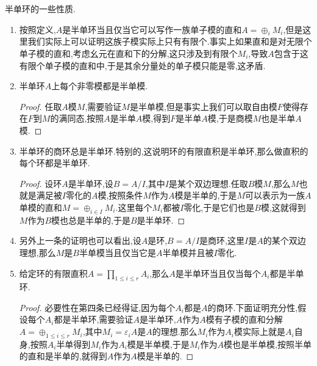 半单环的一些性质.
\begin{enumerate}
	\item 按照定义,$A$是半单环当且仅当它可以写作一族单子模的直和$A=\oplus_iM_i$,但是这里我们实际上可以证明这族子模实际上只有有限个.事实上如果直和是对无限个单子模的直和,考虑幺元在直和下的分解,这只涉及到有限个$M_i$,导致$A$包含于这有限个单子模的直和中,于是其余分量处的单子模只能是零,这矛盾.
	\item 半单环$A$上每个非零模都是半单模.
	\begin{proof}
		
		任取$A$模$M$,需要验证$M$是半单模,但是事实上我们可以取自由模$F$使得存在$F$到$M$的满同态,按照$A$是半单$A$模,得到$F$是半单$A$模,于是商模$M$也是半单$A$模.
	\end{proof}
	\item 半单环的商环总是半单环.特别的,这说明环的有限直积是半单环,那么做直积的每个环都是半单环.
	\begin{proof}
		
		设环$A$是半单环,设$B=A/I$,其中$I$是某个双边理想.任取$B$模$M$,那么$M$也就是满足被$I$零化的$A$模,按照条件$M$作为$A$模是半单的,于是$M$可以表示为一族$A$单模的直和$M=\oplus_{i\in I}M_i$.这里每个$M_i$都被$I$零化,于是它们也是$B$模,这就得到$M$作为$B$模也总是半单的,于是$B$是半单环.
	\end{proof}
	\item 另外上一条的证明也可以看出,设$A$是环,$B=A/I$是商环,这里$I$是$A$的某个双边理想,那么$M$是$B$半单模当且仅当它是$A$半单模并且被$I$零化.
	\item 给定环的有限直积$A=\prod_{1\le i\le r}A_i$,那么$A$是半单环当且仅当每个$A_i$都是半单环.
	\begin{proof}
		
		必要性在第四条已经得证,因为每个$A_i$都是$A$的商环.下面证明充分性,假设每个$A_i$都是半单环,需要验证$A$是半单环,$A$作为$A$模有子模的直和分解$A=\oplus_{1\le i\le r}M_i$,其中$M_i=\varepsilon_iA$是$A$的理想.那么$M_i$作为$A_i$模实际上就是$A_i$自身,按照$A_i$半单得到$M_i$作为$A_i$模是半单模,于是$M_i$作为$A$模也是半单模,按照半单的直和是半单的,就得到$A$作为$A$模是半单的.
	\end{proof}
\end{enumerate}

